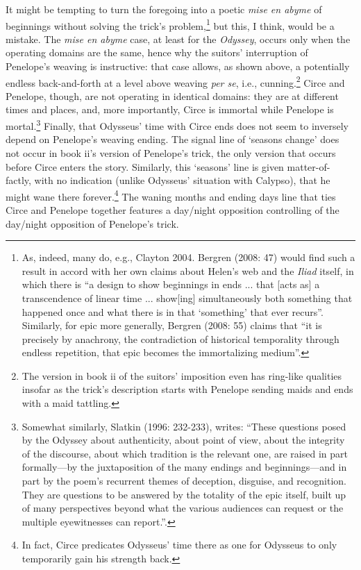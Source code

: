 \documentclass[12pt]{article}
\begin{document}
It might be tempting to turn the foregoing into a poetic \textit{mise en abyme} of beginnings without solving the trick's problem,\footnote{ As, indeed, many do, e.g., Clayton 2004. Bergren  (2008: 47) would find such a result in accord with her own claims about Helen's web and the \textit{Iliad} itself, in which there is ``a design to show beginnings in ends ... that [acts as] a transcendence of linear time ... show[ing] simultaneously both something that happened once and what there is in that `something' that ever recurs''. Similarly, for epic more generally, Bergren (2008: 55) claims that ``it is precisely by anachrony, the contradiction of historical temporality through endless repetition, that epic becomes the immortalizing medium''.} but this, I think, would be a mistake. The \textit{mise en abyme} case, at least for the \textit{Odyssey}, occurs only when the operating domains are the same, hence why the suitors' interruption of Penelope's weaving is instructive: that case allows, as shown above, a potentially endless back-and-forth at a level above weaving \textit{per se}, i.e., cunning.\footnote{ The version in book ii of the suitors' imposition even has ring-like qualities insofar as the trick's description starts with Penelope sending maids and ends with a maid tattling.} Circe and Penelope, though, are not operating in identical domains: they are at different times and places, and, more importantly, Circe is immortal while Penelope is mortal.\footnote{ Somewhat similarly, Slatkin (1996: 232-233), writes: ``These questions posed by the Odyssey about authenticity, about point of view, about the integrity of the discourse, about which tradition is the relevant one, are raised in part formally—by the juxtaposition of the many endings and beginnings—and in part by the poem's recurrent themes of deception, disguise, and recognition. They are questions to be answered by the totality of the epic itself, built up of many perspectives beyond what the various audiences can request or the multiple eyewitnesses can report.''.} Finally, that Odysseus' time with Circe ends does not seem to inversely depend on Penelope's weaving ending. The signal line of `seasons change' does not occur in book ii's version of Penelope's trick, the only version that occurs before Circe enters the story. Similarly, this `seasons' line is given matter-of-factly, with no indication (unlike Odysseus' situation with Calypso), that he might wane there forever.\footnote{ In fact, Circe predicates Odysseus' time there as one for Odysseus to only temporarily gain his strength back.} The waning months and ending days line that ties Circe and Penelope together features a day/night opposition controlling of the day/night opposition of Penelope's trick.
\end{document}
